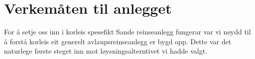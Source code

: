 \chapter{Verkemåten til anlegget}\label{sec:6}
\thispagestyle{fancy}

For å setje oss inn i korleis spesefikt Sande reinseanlegg fungerar var vi nøydd til å forstå
korleis eit generelt avlaupsreinseanlegg er bygd opp. Dette var det naturlege første
steget inn mot løysningsalterntivet vi hadde valgt. 


